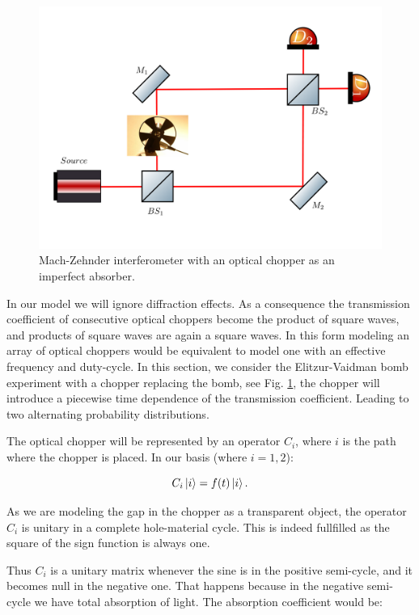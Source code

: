 \documentclass[12pt]{book}
\begin{document}
 \begin{figure}[h!]
\centering
\includegraphics[width=\linewidth]{images/machzenhderchopper.png}
\caption{Mach-Zehnder interferometer with an optical chopper as an imperfect absorber.}
\label{chopper}
\end{figure}

In our model we will ignore diffraction effects. As a consequence the transmission coefficient of consecutive optical choppers become the product of square waves, and products of square waves are again a square waves. In this form modeling an array of optical choppers would be equivalent to model one with an effective frequency and duty-cycle. In this section, we consider the Elitzur-Vaidman bomb experiment with a chopper replacing the bomb, see Fig. \ref{chopper}, the chopper will introduce a piecewise time dependence of the transmission coefficient. Leading to two alternating probability distributions.


The optical chopper will be represented by an operator $C_{i}$, where $i$ is the path where the chopper is placed. In our basis (where $i=1,2$):

\begin{equation}
C_{i}\ket{i}=f(t)\ket{i}.
\end{equation}

As we are modeling the gap in the chopper as a transparent object, the operator $C_i$ is unitary in a complete hole-material cycle.  This is indeed fullfilled as the square of the sign function is always one.


Thus $C_{i}$ is a unitary matrix whenever the sine is in the positive semi-cycle, and it becomes null in the negative one. That happens because in the negative semi-cycle we have total absorption of light. The absorption coefficient would  be:  
\end{document}
